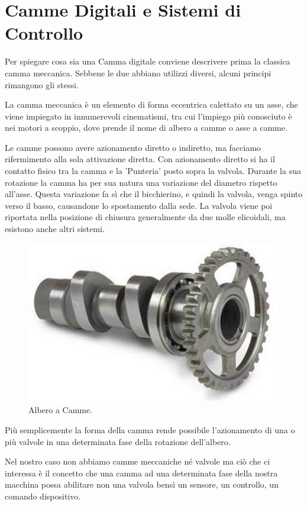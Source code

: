 \documentclass[12pt, a4paper, oneside]{book}
\begin{document}
\section{Camme Digitali e Sistemi di Controllo}
Per spiegare cosa sia una Camma digitale conviene descrivere prima la classica camma meccanica. Sebbene le due abbiano utilizzi diversi, alcuni principi rimangono gli stessi.

La camma meccanica è un elemento di forma eccentrica calettato su un asse, che viene impiegato in innumerevoli cinematismi, tra cui l'impiego più conosciuto è nei motori a scoppio, dove prende il nome di albero a camme o asse a camme.

Le camme possono avere azionamento diretto o indiretto, ma facciamo rifermimento alla sola attivazione diretta.
Con azionamento diretto si ha il contatto fisico tra la camma e la 'Punteria' posto sopra la valvola. Durante la sua rotazione la camma ha per sua natura una variazione del diametro rispetto all'asse. Questa variazione fa sì che il bicchierino, e quindi la valvola, venga spinto verso il basso, causandone lo spostamento dalla sede. La valvola viene poi riportata nella posizione di chiusura generalmente da due molle elicoidali, ma esistono anche altri sistemi.

\begin{figure}[H]
	\centering
	\includegraphics[width=12cm]{Immagini/camme}
	\caption{ Albero a Camme.}
		\label{cam1}
\end{figure}

Più semplicemente la forma della camma rende possibile l'azionamento di una o più valvole in una determinata fase della rotazione dell'albero. 

Nel nostro caso non abbiamo camme meccaniche né valvole ma ciò che ci interessa è il concetto che una camma ad una determinata fase della nostra macchina possa abilitare non una valvola bensì un sensore, un controllo, un comando dispositivo.
\end{document}
